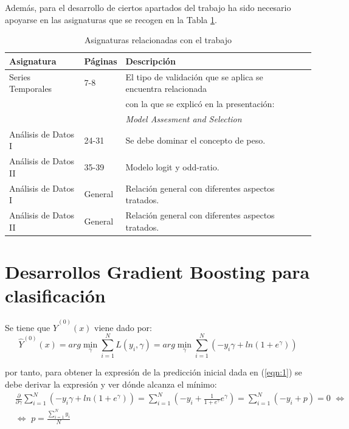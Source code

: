 \documentclass[12pt,twoside]{article}
\begin{document}
Además, para el desarrollo de ciertos apartados del trabajo ha sido necesario apoyarse en las asignaturas que se recogen en la Tabla \ref{tab{03}}.
\begin{table}[ht] 
\centering
\begin{tabular}{llll} 
  \hline
 Asignatura & Páginas & Descripción  \\ 
  \hline
Series Temporales & 7-8 & El tipo de validación que se aplica se encuentra relacionada  \\ 
 &  &  con la que se explicó en la presentación: \\ 
 &  & \textit{Model Assesment and Selection} \\ 
Análisis de Datos I & 24-31 & Se debe dominar el concepto de peso. \\
Análisis de Datos II & 35-39 & Modelo logit y odd-ratio.\\ 
Análisis de Datos I & General & Relación general con diferentes aspectos tratados. \\
Análisis de Datos II & General & Relación general con diferentes aspectos tratados. \\
\hline
\end{tabular}
\caption{Asignaturas relacionadas con el trabajo} \label{tab{03}}
\end{table}




\newpage
\section{Desarrollos Gradient Boosting para clasificación} \label{Anexo2}

Se tiene que $\hat{Y}^{(0)}(x)$ viene dado por:
\begin{equation*}
\hat{Y}^{(0)}(x) = arg\min_{\gamma} \sum_{i=1}^N L(y_i, \gamma) = arg\min_{\gamma} \sum_{i=1}^N \left( -y_i \gamma + ln \left( 1 + e^{\gamma} \right) \right)
\end{equation*}

\noindent
por tanto, para obtener la expresión de la predicción inicial dada en (\ref{eqn:1}) se debe derivar la expresión y ver dónde alcanza el mínimo:
\begin{equation*}
\begin{split}
& \frac{\partial}{\partial \gamma}\sum_{i=1}^N \left( -y_i \gamma + ln \left( 1 + e^{\gamma} \right) \right) = \sum_{i=1}^N \left( -y_i + \frac{1}{1 + e^{\gamma}} e^{\gamma} \right) = \sum_{i=1}^N (-y_i + p) = 0 \, \, \Leftrightarrow  \\
& \Leftrightarrow \, \, p = \frac{\sum_{i=1}^{N} y_i}{N} 
\end{split}
\end{equation*}
\end{document}
